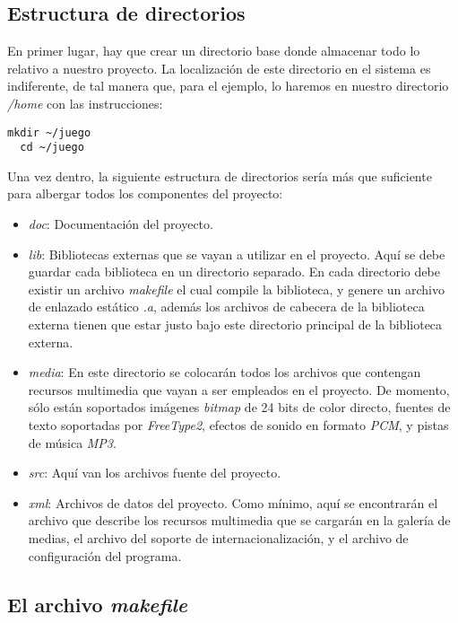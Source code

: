 \subsection{Estructura de directorios}

En primer lugar, hay que crear un directorio base donde almacenar todo lo relativo a nuestro proyecto. La localización de este directorio en el sistema es indiferente, de tal manera que, para el ejemplo, lo haremos en nuestro directorio \emph{/home} con las instrucciones:

\begin{lstlisting}[style=consola]
  mkdir ~/juego
  cd ~/juego
\end{lstlisting}

Una vez dentro, la siguiente estructura de directorios sería más que suficiente para albergar todos los componentes del proyecto:

\begin{itemize}
\item \emph{doc}: Documentación del proyecto.
\item \emph{lib}: Bibliotecas externas que se vayan a utilizar en el proyecto. Aquí se debe guardar cada biblioteca en un directorio separado. En cada directorio debe existir un archivo \emph{makefile} el cual compile la biblioteca, y genere un archivo de enlazado estático \emph{.a}, además los archivos de cabecera de la biblioteca externa tienen que estar justo bajo este directorio principal de la biblioteca externa.
\item \emph{media}: En este directorio se colocarán todos los archivos que contengan recursos multimedia que vayan a ser empleados en el proyecto. De momento, sólo están soportados imágenes \emph{bitmap} de 24 bits de color directo, fuentes de texto soportadas por \emph{FreeType2}, efectos de sonido en formato \emph{PCM}, y pistas de música \emph{MP3}.
\item \emph{src}: Aquí van los archivos fuente del proyecto.
\item \emph{xml}: Archivos de datos del proyecto. Como mínimo, aquí se encontrarán el archivo que describe los recursos multimedia que se cargarán en la galería de medias, el archivo del soporte de internacionalización, y el archivo de configuración del programa.
\end{itemize}

\subsection{El archivo \emph{makefile}}

